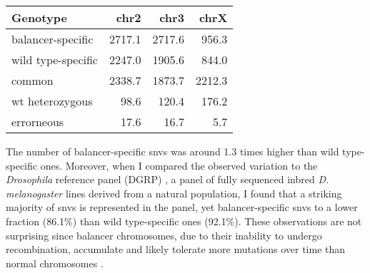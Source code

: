 \begin{table}[ht]
    \centering
    \begin{tabu}{lrrr}
        \toprule
        Genotype & \ac{chr2} & \ac{chr3} & \ac{chrX} \\
        \midrule
        balancer-specific  & 2717.1 & 2717.6 &  956.3 \\
        wild type-specific & 2247.0 & 1905.6 &  844.0 \\
        common             & 2338.7 & 1873.7 & 2212.3 \\
        wt heterozygous    &   98.6 &  120.4 &  176.2 \\
        errorneous         &   17.6 &   16.7 &    5.7 \\
        \bottomrule
    \end{tabu}
\end{table}

The number of balancer-specific \acp{snv} was around 1.3 times higher than wild
type-specific ones. Moreover, when I compared the observed variation to the \textit{Drosophila}
reference panel (DGRP) \citep{Mackay2012,Huang2014}, a panel of fully sequenced
inbred \textit{D. melanogaster} lines derived from a natural population, I
found that a striking majority of \acp{snv} is represented in the panel, yet
balancer-specific \acp{snv} to a lower fraction (86.1\%) than wild type-specific
ones (92.1\%). These observations are not surprising since balancer chromosomes,
due to their inability to undergo recombination, accumulate and likely tolerate
more mutations over time than normal chromosomes \citep{Araye2013}.

